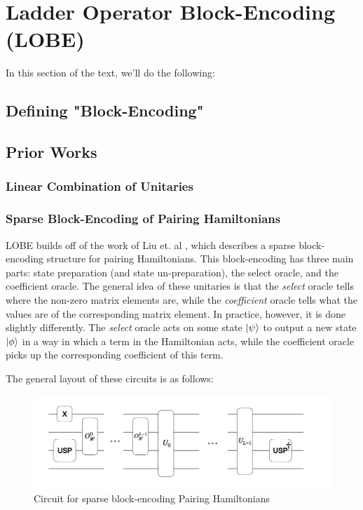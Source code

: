 \section{Ladder Operator Block-Encoding (LOBE)}
\label{sec:lobe}

In this section of the text, we'll do the following:
\subsection{Defining "Block-Encoding"}
\label{subsec:block-encoding}

\subsection{Prior Works}
\label{subsec:prior-works}

\subsubsection{Linear Combination of Unitaries}

\subsubsection{Sparse Block-Encoding of Pairing Hamiltonians}
LOBE builds off of the work of Liu et. al \cite{liu2024efficient}, which describes a sparse block-encoding structure for pairing Hamiltonians. This block-encoding has three main parts: state preparation (and state un-preparation), the select oracle, and the coefficient oracle. The general idea of these unitaries is that the \textit{select} oracle tells where the non-zero matrix elements are, while the \textit{coefficient} oracle tells what the values are of the corresponding matrix element. 
In practice, however, it is done slightly differently. The \textit{select} oracle acts on some state $\ket{\psi}$ to output a new state $\ket{\phi}$ in a way in which a term in the Hamiltonian acts, while the coefficient oracle picks up the corresponding coefficient of this term. 

The general layout of these circuits is as follows: 

\begin{figure}[h]
    \includegraphics[width = \linewidth]{figures/SBE.png}
    \caption{Circuit for sparse block-encoding Pairing Hamiltonians}
\end{figure}

